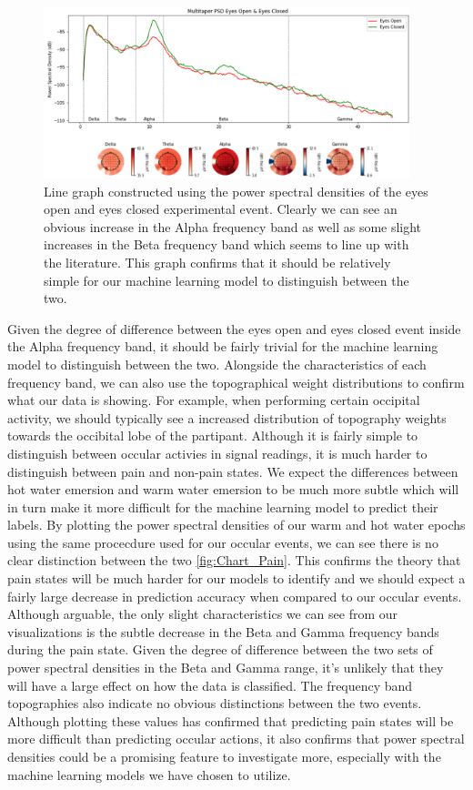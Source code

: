 \documentclass[11pt]{article}
\begin{document}
\begin{figure}[tb]
\centering
\includegraphics[width=0.95\textwidth]{2.png}
\caption{\label{fig:Chart}
Line graph constructed using the power spectral densities of the eyes open and eyes closed experimental event. Clearly we can see an obvious increase in the Alpha frequency band as well as some slight increases in the Beta frequency band which seems to line up with the literature. This graph confirms that it should be relatively simple for our machine learning model to distinguish between the two. }
\end{figure} 

Given the degree of difference between the eyes open and eyes closed event inside the Alpha frequency band, it should be fairly trivial for the machine learning model to distinguish between the two. Alongside the characteristics of each frequency band, we can also use the topographical weight distributions to confirm what our data is showing. For example, when performing certain occipital activity, we should typically see a increased distribution of topography weights towards the occibital lobe of the partipant. Although it is fairly simple to distinguish between occular activies in signal readings, it is much harder to distinguish between pain and non-pain states. We expect the differences between hot water emersion and warm water emersion to be much more subtle which will in turn make it more difficult for the machine learning model to predict their labels. By plotting the power spectral densities of our warm and hot water epochs using the same procecdure used for our occular events, we can see there is no clear distinction between the two \ref{fig:Chart_Pain}. This confirms the theory that pain states will be much harder for our models to identify and we should expect a fairly large decrease in prediction accuracy when compared to our occular events. Although arguable, the only slight characteristics we can see from our visualizations is the subtle decrease in the Beta and Gamma frequency bands during the pain state. Given the degree of difference between the two sets of power spectral densities in the Beta and Gamma range, it's unlikely that they will have a large effect on how the data is classified. The frequency band topographies also indicate no obvious distinctions between the two events. Although plotting these values has confirmed that predicting pain states will be more difficult than predicting occular actions, it also confirms that power spectral densities could be a promising feature to investigate more, especially with the machine learning models we have chosen to utilize.
\end{document}
